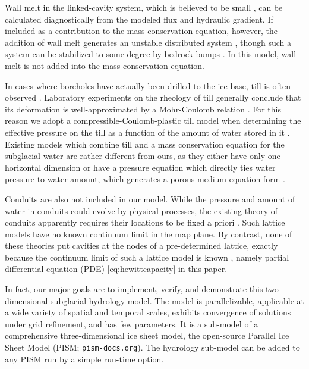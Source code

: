 \documentclass[gmd]{copernicus}   %
\begin{document}
Wall melt in the linked-cavity system, which is believed to be small \citep{Kamb1987}, can be calculated diagnostically from the modeled flux and hydraulic gradient.  If included as a contribution to the mass conservation equation, however, the addition of wall melt generates an unstable distributed system \citep{Walder1982}, though such a system can be stabilized to some degree by bedrock bumps \citep{CreytsSchoof2009}.  In this model, wall melt is not added into the mass conservation equation.

In cases where boreholes have actually been drilled to the ice base, till is often observed \citep{Hookeetal1997,Tulaczyketal2000,TrufferHarrisonEchelmeyer2000,TrufferHarrison2006}.  Laboratory experiments on the rheology of till \citep{Kamb1991,Hookeetal1997,Tulaczyketal2000,TrufferEchelmeyerHarrison2001} generally conclude that its deformation is well-approximated by a Mohr-Coulomb relation \citep{SchoofTill}.  For this reason we adopt a compressible-Coulomb-plastic till model when determining the effective pressure on the till as a function of the amount of water stored in it \citep{Tulaczyketal2000}.  Existing models which combine till and a mass conservation equation for the subglacial water are rather different from ours, as they either have only one-horizontal dimension \citep{vanderWeletal2013} or have a pressure equation which directly ties water pressure to water amount, which generates a porous medium equation form \citep{FlowersClarke2002_theory,deFleurianetal2014}.

Conduits are also not included in our model.  While the pressure and amount of water in conduits could evolve by physical processes, the existing theory of conduits apparently requires their locations to be fixed a priori \citep{Schoofmeltsupply,Hewitt2013,Werderetal2013}.  Such lattice models have no known continuum limit in the map plane.  By contrast, none of these theories put cavities at the nodes of a pre-determined lattice, exactly because the continuum limit of such a lattice model is known \citep{Hewitt2011}, namely partial differential equation (PDE) \eqref{eq:hewittcapacity} in this paper.

In fact, our major goals are to implement, verify, and demonstrate this two-dimensional subglacial hydrology model.  The model is parallelizable, applicable at a wide variety of spatial and temporal scales, exhibits convergence of solutions under grid refinement, and has few parameters.  It is a sub-model of a comprehensive three-dimensional ice sheet model, the open-source Parallel Ice Sheet Model (PISM; \texttt{pism-docs.org}).  The hydrology sub-model can be added to any PISM run by a simple run-time option.
\end{document}
